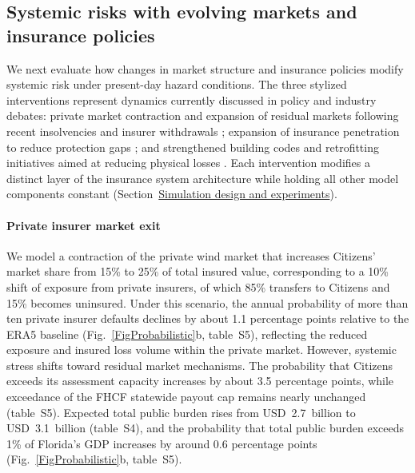 \documentclass[fleqn,10pt]{wlscirep}
\newcommand{\SITabIV}{table~S4}
\newcommand{\SITabV}{table~S5}
\begin{document}
\subsection*{Systemic risks with evolving markets and insurance policies}
We next evaluate how changes in market structure and insurance policies modify systemic risk under present-day hazard conditions. The three stylized interventions represent dynamics currently discussed in policy and industry debates: private market contraction and expansion of residual markets following recent insolvencies and insurer withdrawals \cite{hemmati_growing_2025,CDI2024AnnualReport,kousky_evolution_2024};
expansion of insurance penetration to reduce protection gaps \cite{kousky_insurance_2024}; and strengthened building codes and retrofitting initiatives aimed at reducing physical losses \cite{wolf_are_2025,ibhs_fortified_standard_2025}. Each intervention modifies a distinct layer of the insurance system architecture while holding all other model components constant (Section~\hyperref[MethodsPolicy]{Simulation design and experiments}). \medskip

\paragraph{Private insurer market exit}
We model a contraction of the private wind market that increases Citizens' market share from 15\% to 25\% of total insured value, corresponding to a 10\% shift of exposure from private insurers, of which 85\% transfers to Citizens and 15\% becomes uninsured.
Under this scenario, the annual probability of more than ten private insurer defaults declines by about 1.1 percentage points relative to the ERA5 baseline (Fig.~\ref{FigProbabilistic}b, \SITabV), reflecting the reduced exposure and insured loss volume within the private market. However, systemic stress shifts toward residual market mechanisms. The probability that Citizens exceeds its assessment capacity increases by about 3.5 percentage points, while exceedance of the FHCF statewide payout cap remains nearly unchanged (\SITabV). Expected total public burden rises from USD~2.7~billion to USD~3.1~billion (\SITabIV), and the probability that total public burden exceeds 1\% of Florida's GDP increases by around 0.6 percentage points (Fig.~\ref{FigProbabilistic}b, \SITabV). 
\end{document}
